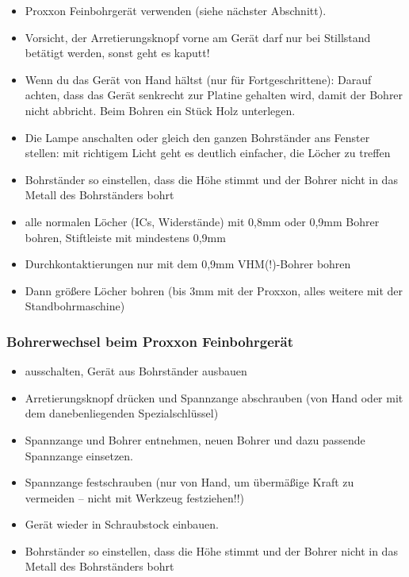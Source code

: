 \documentclass{\basedir/fablab-document}
\begin{document}
\begin{itemize}
\item Proxxon Feinbohrgerät verwenden (siehe nächster Abschnitt).
\item Vorsicht, der Arretierungsknopf vorne am Gerät darf nur bei Stillstand betätigt werden, sonst geht es kaputt!
\item Wenn du das Gerät von Hand hältst (nur für Fortgeschrittene): Darauf achten, dass das Gerät senkrecht zur Platine gehalten wird, damit der Bohrer nicht abbricht. Beim Bohren ein Stück Holz unterlegen.
\item Die Lampe anschalten oder gleich den ganzen Bohrständer ans Fenster stellen: mit richtigem Licht geht es deutlich einfacher, die Löcher zu treffen
\item Bohrständer so einstellen, dass die Höhe stimmt und der Bohrer nicht in das Metall des Bohrständers bohrt
\item alle normalen Löcher (ICs, Widerstände) mit 0,8mm oder 0,9mm Bohrer bohren, Stiftleiste mit mindestens 0,9mm
\item Durchkontaktierungen nur mit dem 0,9mm VHM(!)-Bohrer bohren
\item Dann größere Löcher bohren (bis 3mm mit der Proxxon, alles weitere mit der Standbohrmaschine)
\end{itemize}

\subsubsection{Bohrerwechsel beim Proxxon Feinbohrgerät}
\begin{itemize}
 \item ausschalten, Gerät aus Bohrständer ausbauen
 \item Arretierungsknopf drücken und Spannzange abschrauben (von Hand oder mit dem danebenliegenden Spezialschlüssel)
 \item Spannzange und Bohrer entnehmen, neuen Bohrer und dazu passende Spannzange einsetzen.
 \item Spannzange festschrauben (nur von Hand, um übermäßige Kraft zu vermeiden -- nicht mit Werkzeug festziehen!!)
 \item Gerät wieder in Schraubstock einbauen.
 \item Bohrständer so einstellen, dass die Höhe stimmt und der Bohrer nicht in das Metall des Bohrständers bohrt
\end{itemize}
\end{document}
